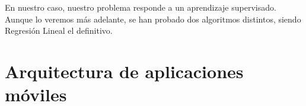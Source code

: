 %
%	
%	
	
	En nuestro caso, nuestro problema responde a un aprendizaje supervisado. Aunque lo veremos más adelante, se han probado dos algoritmos distintos, siendo Regresión Lineal el definitivo.
	
\section{Arquitectura de aplicaciones móviles}

